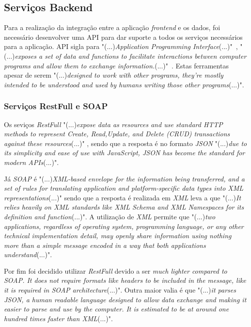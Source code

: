 \subsection{Serviços Backend}

Para a realização da integração entre a aplicação \emph{frontend} e os dados, foi necessário desenvolver uma API para dar suporte a todos os serviços necessários para a aplicação.
API sigla para "(...)\emph{Application Programming Interface}(...)"~\citep{rest_cookbook}, "(...)\emph{exposes a set of data and functions to facilitate interactions between computer programs and allow them to exchange information.}(...)"~\citep{rest_cookbook}.
Estas ferramentas apesar de serem "(...)\emph{designed to work with other programs, they’re mostly intended to be understood and used by humans writing those other programs}(...)"\citep{api_design}.

\newpage

\subsubsection{Serviços RestFull e SOAP}
Os seviços \emph{RestFull} "(...)\emph{expose data as resources and use standard HTTP methods to represent Create, Read,Update, and Delete (CRUD) transactions against these resources}(...)"
\citep{api_design}, sendo que a resposta é no formato \emph{JSON} "(...)\emph{due to its simplicity and ease of use with JavaScript, JSON has become the standard for modern APIs}(...)"\citep{api_design}.

Já \emph{SOAP} é "(...)\emph{XML-based envelope for the information being transferred, and a set of rules for translating application and platform-specific data types into XML representations}(...)"\citep{Snell2002} sendo que a resposta é realizada em \emph{XML} leva a que "(...)\emph{It relies heavily on XML standards like XML Schema and XML Namespaces for its definition and function}(...)"\citep{Snell2002}. A utilização de \emph{XML} permite que "(...)\emph{two applications, regardless of operating system, programming language, or any other technical implementation detail, may openly share information using nothing more than a simple message encoded in a way that both applications understand}(...)"\citep{Snell2002}.

Por fim foi decidido utilizar \emph{RestFull} devido a ser \emph{much lighter compared to SOAP. It does not require formats like headers to be included in the message, like it is required in SOAP architecture}(...)"\citep{Halili2018}. Outra maior valia é que "(...)\emph{it parses JSON, a human readable language designed to allow data exchange and making it easier to parse and use by the computer. It is estimated to be at around one hundred times faster than XML}(...)"\citep{Halili2018}.

